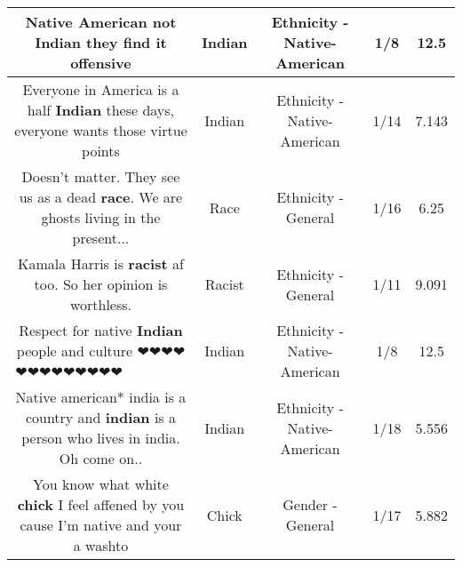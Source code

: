 \documentclass[11pt]{article}
\newlength\mylength
\begin{document}
\begin{center}
\begin{longtable}{|C{.65\mylength}|C{.30\mylength}|C{.12\mylength}|C{.12\mylength}|C{.12\mylength}|}
  \small Native American not \textbf{Indian} they find it offensive\normalsize   & Indian & Ethnicity - Native-American & 1/8 & 12.5 \\  \hline
  \small Everyone in America is a half \textbf{Indian} these days, everyone wants those virtue points\normalsize   & Indian & Ethnicity - Native-American & 1/14 & 7.143 \\  \hline
  \small Doesn't matter. They see us as a dead \textbf{race}. We are ghosts living in the present...\normalsize   & Race & Ethnicity - General & 1/16 & 6.25 \\  \hline
  \small Kamala Harris is \textbf{racist} af too. So her opinion is worthless.\normalsize   & Racist & Ethnicity - General & 1/11 & 9.091 \\  \hline
  \small Respect for native \textbf{Indian} people and culture ❤❤❤❤❤❤❤❤❤❤❤❤❤💪💪💪💪💪🤝🤝🤝💪💪💪💪💪💪💪💪\normalsize   & Indian & Ethnicity - Native-American & 1/8 & 12.5 \\  \hline
  \small Native american* india is a country and \textbf{indian} is a person who lives in india. Oh come on..\normalsize   & Indian & Ethnicity - Native-American & 1/18 & 5.556 \\  \hline
  \small You know what white \textbf{chick} I feel affened by you cause I'm native and your a washto\normalsize   & Chick & Gender - General & 1/17 & 5.882 \\  \hline

\end{longtable}
\end{center}
\end{document}
